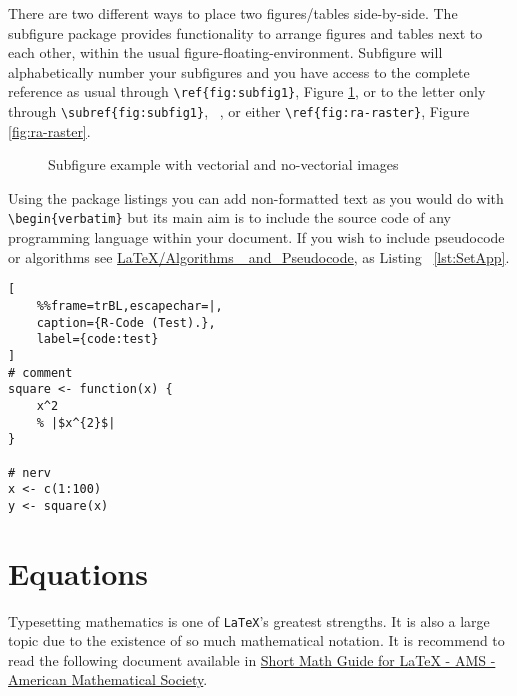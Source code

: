 There are two different ways to place two figures/tables side-by-side. The subfigure package provides functionality to arrange figures and tables next to each other, within the usual figure-floating-environment. Subfigure will alphabetically number your subfigures and you have access to the complete reference as usual through \verb!\ref{fig:subfig1}!, Figure \ref{fig:figura-completa}, or to the letter only through \verb!\subref{fig:subfig1}!, ~, or either \verb!\ref{fig:ra-raster}!, Figure \ref{fig:ra-raster}.

\begin{figure}[htbp]
	\centering
\qquad\qquad
  \caption{Subfigure example with vectorial and no-vectorial images}
  \label{fig:figura-completa}
\end{figure}


Using the package listings you can add non-formatted text as you would do with \verb!\begin{verbatim}! but its main aim is to include the source code of any programming language within your document. If you wish to include pseudocode or algorithms see \href{http://en.wikibooks.org/wiki/LaTeX/Algorithms_and_Pseudocode}{LaTeX/Algorithms\_ and\_Pseudocode}, as Listing ~\ref{lst:SetApp}.


\begin{minipage}{\textwidth}
\lstset{language=R,numbers=left}
\begin{lstlisting}[
    %%frame=trBL,escapechar=|,
    caption={R-Code (Test).},
    label={code:test}
]
# comment
square <- function(x) {
    x^2
    % |$x^{2}$|
}

# nerv
x <- c(1:100)
y <- square(x)
\end{lstlisting}
\end{minipage}

\section{Equations}

Typesetting mathematics is one of \texttt{LaTeX}'s greatest strengths. It is also a large topic due to the existence of so much mathematical notation. It is recommend to read the following document available in \href{http://www.google.pt/url?sa=t&rct=j&q=&esrc=s&source=web&cd=1&cad=rja&ved=0CB4QFjAA&url=ftp%3A%2F%2Fftp.ams.org%2Fpub%2Ftex%2Fdoc%2Famsmath%2Fshort-math-guide.pdf&ei=DkScUOm8IJC5hAei7oGQDg&usg=AFQjCNEHl1pXuurNmXAdqfC0z-pPAbDyUw}{Short Math Guide for LaTeX - AMS - American Mathematical Society}.

